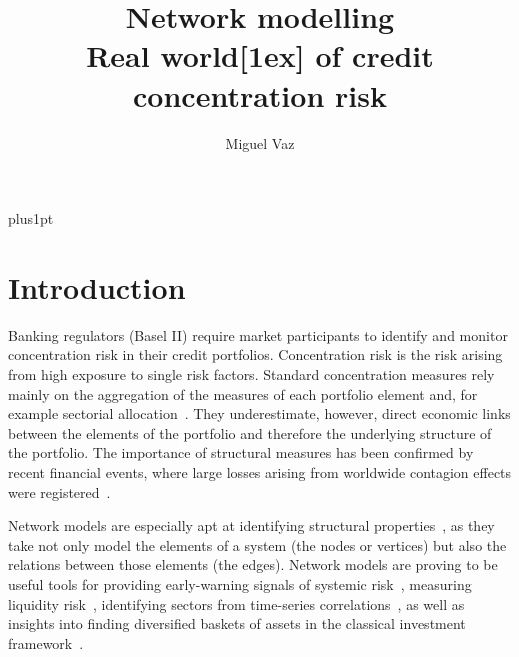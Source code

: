 \documentclass[12pt,beltcrest]{ociamthesis} %
\title{Network modelling \\ Real world[1ex]
of credit concentration risk}
\author{Miguel Vaz}        %
\begin{document}
\baselineskip=18pt plus1pt

\setcounter{secnumdepth}{3}
\setcounter{tocdepth}{3}


\maketitle                  %

\begin{romanpages}          %
\tableofcontents            %
\listoffigures              %
\end{romanpages}            %

\chapter{Introduction}



Banking regulators (Basel II) require market participants to identify and monitor concentration risk in their credit portfolios. Concentration risk is the risk arising from high exposure to single risk factors. Standard concentration measures rely mainly on the aggregation of the measures of each portfolio element and, for example sectorial allocation~\cite{lutkebohmert2008concentration}.
They underestimate, however, direct economic links between the elements of the portfolio and therefore the underlying structure of the portfolio.
The importance of structural measures has been confirmed by recent financial events, where large losses arising from worldwide contagion effects were registered~\cite{Kazi:2013vr}.
	
Network models are especially apt at identifying structural properties~\cite{newman2010networks}, as they take not only model the elements of a system (the nodes or vertices) but also the relations between those elements (the edges). Network models are proving to be useful tools for providing early-warning signals of systemic risk~\cite{Squartini:2013ev}, measuring liquidity risk~\cite{Karas:2012tp}, identifying sectors from time-series correlations~\cite{Onnela:2004vz,Fenn:2009uf,Fenn:2011kp}, as well as insights into finding diversified baskets of assets in the classical investment framework~\cite{Pozzi:2013ci}.
\end{document}
